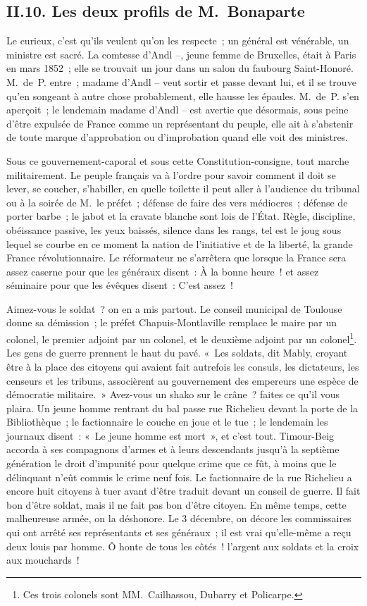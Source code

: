 \documentclass[french,twoside]{book} %
\begin{document}
\subsection[{II.10. Les deux profils de M. Bonaparte}]{II.10. Les deux profils de M. Bonaparte}
\noindent Le curieux, c’est qu’ils veulent qu’on les respecte ; un général est vénérable, un ministre est sacré. La comtesse d’Andl –, jeune femme de Bruxelles, était à Paris en mars 1852 ; elle se trouvait un jour dans un salon du faubourg Saint-Honoré. M. de P. entre ; madame d’Andl – veut sortir et passe devant lui, et il se trouve qu’en songeant à autre chose probablement, elle hausse les épaules. M. de P. s’en aperçoit ; le lendemain madame d’Andl – est avertie que désormais, sous peine d’être expulsée de France comme un représentant du peuple, elle ait à s’abstenir de toute marque d’approbation ou d’improbation quand elle voit des ministres.\par
Sous ce gouvernement-caporal et sous cette Constitution-consigne, tout marche militairement. Le peuple français va à l’ordre pour savoir comment il doit se lever, se coucher, s’habiller, en quelle toilette il peut aller à l’audience du tribunal ou à la soirée de M. le préfet ; défense de faire des vers médiocres ; défense de porter barbe ; le jabot et la cravate blanche sont lois de l’État. Règle, discipline, obéissance passive, les yeux baissés, silence dans les rangs, tel est le joug sous lequel se courbe en ce moment la nation de l’initiative et de la liberté, la grande France révolutionnaire. Le réformateur ne s’arrêtera que lorsque la France sera assez caserne pour que les généraux disent : À la bonne heure ! et assez séminaire pour que les évêques disent : C’est assez !\par
Aimez-vous le soldat ? on en a mis partout. Le conseil municipal de Toulouse donne sa démission ; le préfet Chapuis-Montlaville remplace le maire par un colonel, le premier adjoint par un colonel, et le deuxième adjoint par un colonel\footnote{Ces trois colonels sont MM. Cailhassou, Dubarry et Policarpe.}. Les gens de guerre prennent le haut du pavé. « Les soldats, dit Mably, croyant être à la place des citoyens qui avaient fait autrefois les consuls, les dictateurs, les censeurs et les tribuns, associèrent au gouvernement des empereurs une espèce de démocratie militaire. » Avez-vous un shako sur le crâne ? faites ce qu’il vous plaira. Un jeune homme rentrant du bal passe rue Richelieu devant la porte de la Bibliothèque ; le factionnaire le couche en joue et le tue ; le lendemain les journaux disent : « Le jeune homme est mort », et c’est tout. Timour-Beig accorda à ses compagnons d’armes et à leurs descendants jusqu’à la septième génération le droit d’impunité pour quelque crime que ce fût, à moins que le délinquant n’eût commis le crime neuf fois. Le factionnaire de la rue Richelieu a encore huit citoyens à tuer avant d’être traduit devant un conseil de guerre. Il fait bon d’être soldat, mais il ne fait pas bon d’être citoyen. En même temps, cette malheureuse armée, on la déshonore. Le 3 décembre, on décore les commissaires qui ont arrêté ses représentants et ses généraux ; il est vrai qu’elle-même a reçu deux louis par homme. Ô honte de tous les côtés ! l’argent aux soldats et la croix aux mouchards !\par
\end{document}
